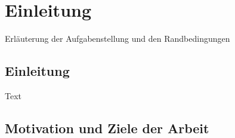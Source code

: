\chapter{Einleitung}
\label{sec:einl}

Erläuterung der Aufgabenstellung und den Randbedingungen

\section{Einleitung}

Text

\section{Motivation und Ziele der Arbeit}